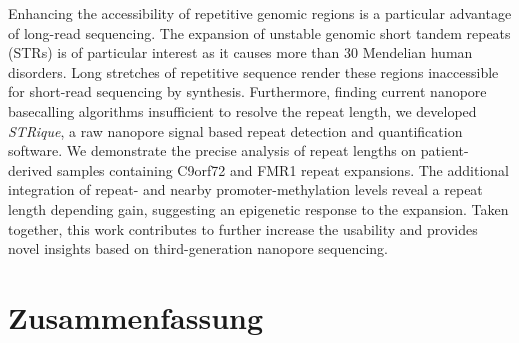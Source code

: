 Enhancing the accessibility of repetitive genomic regions is a particular advantage of long-read sequencing.
The expansion of unstable genomic short tandem repeats (STRs) is of particular interest as it causes more than 30 Mendelian human disorders.
Long stretches of repetitive sequence render these regions inaccessible for short-read sequencing by synthesis.
Furthermore, finding current nanopore basecalling algorithms insufficient to resolve the repeat length, we developed \textit{STRique}, a raw nanopore signal based repeat detection and quantification software.
We demonstrate the precise analysis of repeat lengths on patient-derived samples containing C9orf72 and FMR1 repeat expansions. 
The additional integration of repeat- and nearby promoter-methylation levels reveal a repeat length depending gain, suggesting an epigenetic response to the expansion.
Taken together, this work contributes to further increase the usability and provides novel insights based on third-generation nanopore sequencing.




\cleardoublepage
\vspace*{10mm}
\section*{Zusammenfassung}
\label{sec:zusammenfassung}

